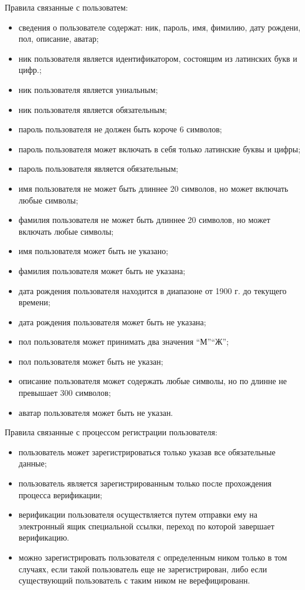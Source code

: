 Правила связанные с пользоватем:
\begin{itemize}
\item сведения о пользователе содержат: ник, пароль, имя, фимилию, дату рождени, пол, описание, аватар;
\item ник пользователя является идентификатором, состоящим из латинских букв и цифр.;
\item ник пользователя является униальным;
\item ник пользователя является обязательным;
\item пароль пользователя не должен быть короче 6 символов;
\item пароль пользователя может включать в себя только латинские буквы и цифры;
\item пароль пользователя является обязательным;
\item имя пользователя не может быть длиннее 20 символов, но может включать любые символы;
\item фамилия пользователя не может быть длиннее 20 символов, но может включать любые символы;
\item имя пользователя может быть не указано;
\item фамилия пользователя может быть не указана;
\item дата рождения пользователя находится в диапазоне от 1900 г. до текущего времени;
\item дата рождения пользователя может быть не указана;
\item пол пользователя может принимать два значения ``М''\/``Ж'';
\item пол пользователя может быть не указан;
\item описание пользователя может содержать любые символы, но по длинне не превышает 300 символов;
\item аватар пользователя может быть не указан.
\end{itemize}

Правила связанные с процессом регистрации пользователя:
\begin{itemize}
\item пользователь может зарегистрироваться только указав все обязательные данные;
\item пользователь является зарегистрированным только после прохождения процесса верификации;
\item верификации пользователя осуществляется путем отправки ему на электронный ящик специальной ссылки,
  переход по которой завершает верификацию.
\item можно зарегистрировать пользователя с определенным ником только в том случаях, если такой пользователь
  еще не зарегистрирован, либо если существующий пользователь с таким ником не верефицированн.
\end{itemize}

